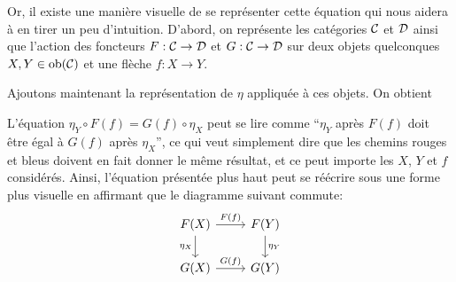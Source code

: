 Or, il existe une manière visuelle de se représenter cette équation qui nous
aidera à en tirer un peu d'intuition. D'abord, on représente les catégories
$\mathcal{C}$ et $\mathcal{D}$ ainsi que l'action des foncteurs $F : \mathcal{C} \to \mathcal{D}$ et $G : \mathcal{C} \to \mathcal{D}$
sur deux objets quelconques $X,Y \in \mathrm{ob}(\mathcal{C})$ et une flèche $f : X \to Y$.


Ajoutons maintenant la représentation de $\eta$ appliquée à ces objets. On
obtient


L'équation $\eta_Y \circ F(f) = G(f) \circ \eta_X$ peut se lire comme
``$\eta_Y$ après $F(f)$ doit être égal à $G(f)$ après $\eta_X$'', ce
qui veut simplement dire que les chemins rouges et bleus doivent en fait
donner le même résultat, et ce peut importe les $X$, $Y$ et $f$ considérés.
Ainsi, l'équation présentée plus haut peut se réécrire sous une forme plus
visuelle en affirmant que le diagramme suivant commute:
\[
\begin{tikzcd}
    F(X) \arrow[d, "\eta_X"'] \arrow[r, "F(f)"] & F(Y) \arrow[d, "\eta_Y"] \\
    G(X) \arrow[r, "G(f)"] & G(Y)
\end{tikzcd}
\]


